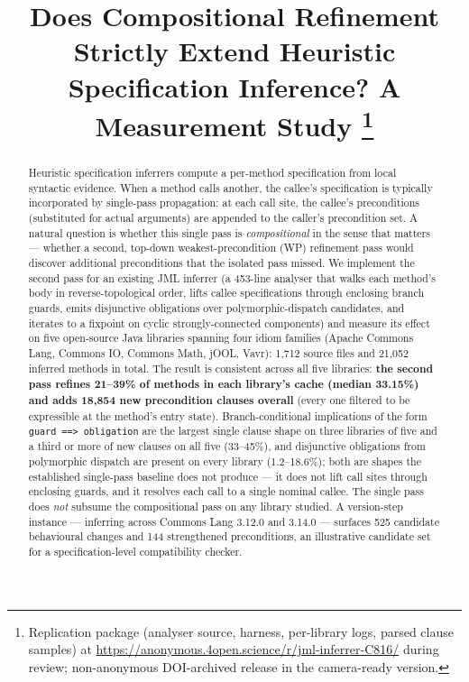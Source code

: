 \documentclass[10pt,conference]{IEEEtran}
\begin{document}
\title{Does Compositional Refinement Strictly Extend Heuristic\\
       Specification Inference? A Measurement Study%
\thanks{Replication package (analyser source, harness, per-library logs, parsed clause samples) at \protect\url{https://anonymous.4open.science/r/jml-inferrer-C816/} during review; non-anonymous DOI-archived release in the camera-ready version.}}

\author{%
}

\maketitle

\begin{abstract}
Heuristic specification inferrers compute a per-method specification
from local syntactic evidence. When a method calls another, the
callee's specification is typically incorporated by single-pass
propagation: at each call site, the callee's preconditions
(substituted for actual arguments) are appended to the caller's
precondition set. A natural question is whether this single pass is
\emph{compositional} in the sense that matters --- whether a second,
top-down weakest-precondition (WP) refinement pass would discover
additional preconditions that the isolated pass missed. We implement
the second pass for an existing JML inferrer (a 453-line analyser
that walks each method's body in reverse-topological order, lifts
callee specifications through enclosing branch guards, emits
disjunctive obligations over polymorphic-dispatch candidates, and
iterates to a fixpoint on cyclic strongly-connected components) and
measure its effect on five open-source Java libraries spanning four
idiom families (Apache Commons Lang, Commons IO, Commons Math, jOOL,
Vavr): 1{,}712 source files and 21{,}052 inferred methods in total.
The result is consistent across all five libraries: \textbf{the second pass refines 21--39\% of
methods in each library's cache (median 33.15\%) and adds 18{,}854
new precondition clauses overall} (every one filtered to be
expressible at the method's entry state). Branch-conditional
implications of the form \texttt{guard ==> obligation} are the
largest single clause shape on three libraries of five and a third
or more of new clauses on all five (33--45\%), and disjunctive
obligations from polymorphic dispatch are present on every library
(1.2--18.6\%); both are shapes the established single-pass baseline does not produce ---
it does not lift call sites through enclosing guards, and it resolves
each call to a single nominal callee. The single pass does
\emph{not} subsume the compositional pass on any library studied.
A version-step instance --- inferring across Commons Lang 3.12.0 and
3.14.0 --- surfaces 525 candidate behavioural changes and 144
strengthened preconditions, an illustrative candidate set for a
specification-level compatibility checker.
\end{abstract}
\end{document}
